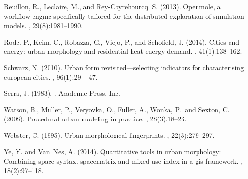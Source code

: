 \documentclass[letterpaper]{article}
\begin{document}
\begin{thebibliography}{}
Reuillon, R., Leclaire, M., and Rey-Coyrehourcq, S. (2013).
\newblock Openmole, a workflow engine specifically tailored for the distributed
  exploration of simulation models.
, 29(8):1981--1990.

Rode, P., Keim, C., Robazza, G., Viejo, P., and Schofield, J. (2014).
\newblock Cities and energy: urban morphology and residential heat-energy
  demand.
,
  41(1):138--162.

Schwarz, N. (2010).
\newblock Urban form revisited---selecting indicators for characterising
  european cities.
, 96(1):29 -- 47.

Serra, J. (1983).
.
\newblock Academic Press, Inc.

Watson, B., M{\"u}ller, P., Veryovka, O., Fuller, A., Wonka, P., and Sexton, C.
  (2008).
\newblock Procedural urban modeling in practice.
, 28(3):18--26.

Webster, C. (1995).
\newblock Urban morphological fingerprints.
,
  22(3):279--297.

Ye, Y. and Van~Nes, A. (2014).
\newblock Quantitative tools in urban morphology: Combining space syntax,
  spacematrix and mixed-use index in a gis framework.
, 18(2):97--118.

\end{thebibliography}
\end{document}
